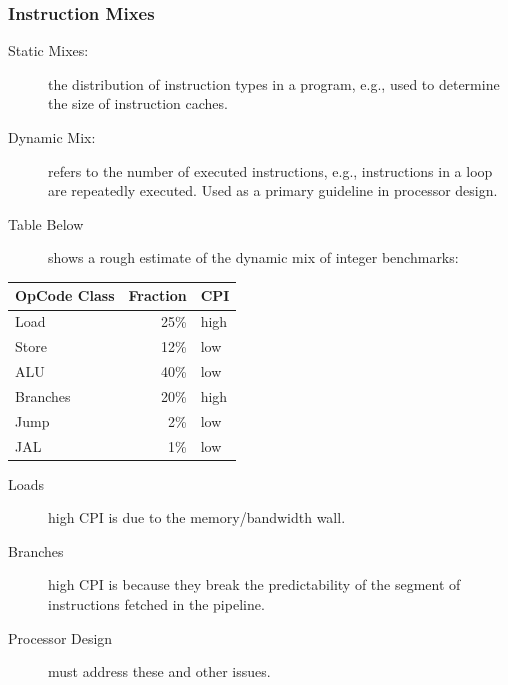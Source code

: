 \documentclass{beamer}
\newcommand{\emp}[1]{\textcolor{DikuRed}{ #1}}
\begin{document}
\begin{frame}[fragile,t]
\frametitle{Instruction Mixes}

\begin{scriptsize}
\begin{description}
\item[Static Mixes:] the distribution of instruction types in a program, e.g.,
                        used to determine the size of instruction caches.
\item[Dynamic Mix:] refers to the number of executed instructions, e.g.,
                        instructions in a loop are repeatedly executed.
                    \emp{Used as a primary guideline in processor design.}
\item[Table Below] shows a rough estimate of the dynamic mix 
                    of integer benchmarks:
\end{description}
\end{scriptsize}

\bigskip

\begin{scriptsize}
\begin{tabular}{lrl}
\hline
OpCode Class & Fraction & CPI  \\\hline
Load         & 25\%     & \alert{high} \\
Store        & 12\%     & low  \\
ALU          & 40\%     & low  \\
Branches     & 20\%     & \alert{high} \\
Jump         & 2\%      & low  \\
JAL          & 1\%      & low  \\
\end{tabular}
\end{scriptsize}

\bigskip

\begin{scriptsize}
\begin{description}
\item[Loads] high CPI is due to the memory/bandwidth wall.
\item[Branches] high CPI is because they break the predictability 
                of the segment of instructions fetched in the pipeline.
\item[Processor Design] must address these and other issues.
\end{description}
\end{scriptsize}
\end{frame}
\end{document}
